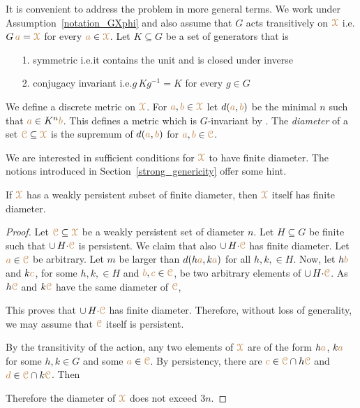 It is convenient to address the problem in more general terms.
We work under Assumption~\ref{notation_GXphi} and also assume that $G$ acts transitively on ${\color{brown}\EuScript X}$ i.e.\@ $G\,{\color{brown} a}={\color{brown}\EuScript X}$ for every ${\color{brown} a}\in{\color{brown}\EuScript X}$.
Let $K\subseteq G$ be a set of generators that is
\begin{itemize}
  \item[1.] symmetric i.e.\@ it contains the unit and is closed under inverse
  \item[2.] conjugacy invariant i.e.\@ $g\,Kg^{-1}=K$ for every $g\in G$
\end{itemize}

We define a discrete metric on ${\color{brown}\EuScript X}$.
For ${\color{brown} a},{\color{brown} b}\in{\color{brown}\EuScript X}$ let $d({\color{brown} a},{\color{brown} b})$ be the minimal $n$ such that ${\color{brown} a}\in K^n{\color{brown} b}$.
This defines a metric which is $G$-invariant by .
The \emph{diameter\/} of a set ${\color{brown}\EuScript C}\subseteq{\color{brown}\EuScript X}$ is the supremum of $d({\color{brown} a},{\color{brown} b})$ for ${\color{brown} a},{\color{brown} b}\in{\color{brown}\EuScript C}$.

We are interested in sufficient conditions for ${\color{brown}\EuScript X}$ to have finite diameter.
The notions introduced in Section~\ref{strong_genericity} offer some hint.

\begin{proposition}\label{prop_wpers_finite_diameter}
  If ${\color{brown}\EuScript X}$ has a weakly persistent subset of finite diameter, then ${\color{brown}\EuScript X}$ itself has finite diameter.
\end{proposition}

\begin{proof}
  Let ${\color{brown}\EuScript C}\subseteq{\color{brown}\EuScript X}$ be a weakly persistent set of diameter $n$.
  Let $H\subseteq G$ be finite such that $\cup\,H{\cdot}{\color{brown}\EuScript C}$ is persistent.
  We claim that also $\cup\,H{\cdot}{\color{brown}\EuScript C}$ has finite diameter.
  Let ${\color{brown} a}\in{\color{brown}\EuScript C}$ be arbitrary.
  Let $m$ be larger than $d(h{\color{brown} a}, k{\color{brown} a})$ for all $h,k,\in H$.
  Now, let $h{\color{brown} b}$ and $k{\color{brown} c}$, for some $h,k,\in H$ and ${\color{brown} b},{\color{brown} c}\in{\color{brown}\EuScript C}$, be two arbitrary elements of $\cup\,H{\cdot}{\color{brown}\EuScript C}$.
  As $h{\color{brown}\EuScript C}$ and $k{\color{brown}\EuScript C}$ have the same diameter of ${\color{brown}\EuScript C}$, 



  This proves that $\cup\,H{\cdot}{\color{brown}\EuScript C}$ has finite diameter.
  Therefore, without loss of generality, we may assume that ${\color{brown}\EuScript C}$ itself is persistent.
  
  By the transitivity of the action, any two elements of ${\color{brown}\EuScript X}$ are of the form $h{\color{brown} a}$, $k{\color{brown} a}$ for some $h,k\in G$ and some ${\color{brown} a}\in{\color{brown}\EuScript C}$.
  By persistency, there are ${\color{brown} c}\in{\color{brown}\EuScript C}\cap h{\color{brown}\EuScript C}$ and ${\color{brown} d}\in{\color{brown}\EuScript C}\cap k{\color{brown}\EuScript C}$.
  Then 



  Therefore the diameter of ${\color{brown}\EuScript X}$ does not exceed $3n$.
\end{proof}


